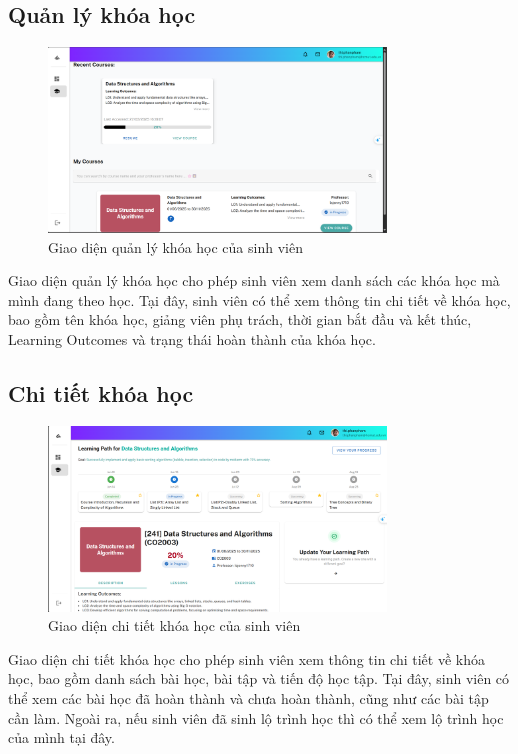\subsection{Quản lý khóa học}
\begin{figure}[H]
    \centering
    \includegraphics[width=0.8\textwidth]{images/CapScreen_Student/CoursesList.png}
    \caption{Giao diện quản lý khóa học của sinh viên}
    \label{fig:course_page}
\end{figure}
Giao diện quản lý khóa học cho phép sinh viên xem danh sách các khóa học mà mình đang theo học. Tại đây, sinh viên có thể xem thông tin chi tiết về khóa học, bao gồm tên khóa học, giảng viên phụ trách, thời gian bắt đầu và kết thúc, Learning Outcomes và trạng thái hoàn thành của khóa học.
\subsection{Chi tiết khóa học}
\begin{figure}[H]
    \centering
    \includegraphics[width=0.8\textwidth]{images/CapScreen_Student/CoursesDetail.png}
    \caption{Giao diện chi tiết khóa học của sinh viên}
    \label{fig:course_detail_page}
\end{figure}
Giao diện chi tiết khóa học cho phép sinh viên xem thông tin chi tiết về khóa học, bao gồm danh sách bài học, bài tập và tiến độ học tập. Tại đây, sinh viên có thể xem các bài học đã hoàn thành và chưa hoàn thành, cũng như các bài tập cần làm. Ngoài ra, nếu sinh viên đã sinh lộ trình học thì có thể xem lộ trình học của mình tại đây.
